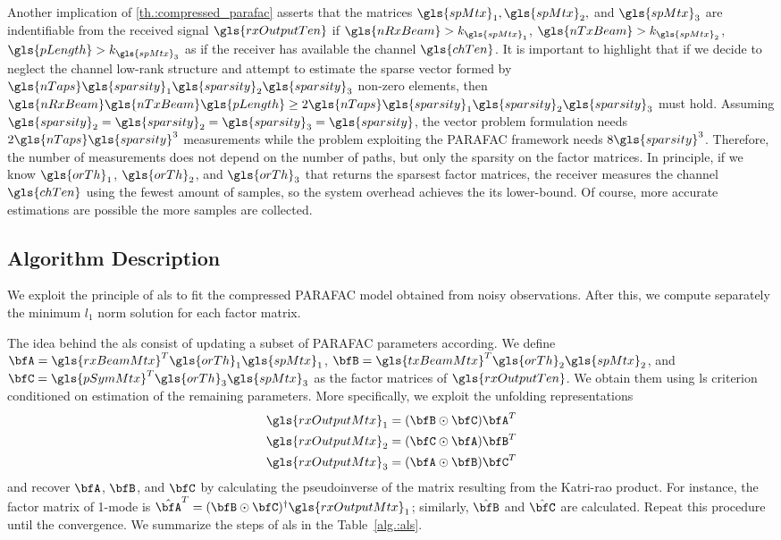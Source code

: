 \documentclass[conference]{IEEEtran}
\begin{document}
Another implication of \ref{th.:compressed_parafac} asserts that the matrices
$\gls{spMtx}_1, \gls{spMtx}_2,$ and $\gls{spMtx}_3$ are indentifiable from the
received signal $\gls{rxOutputTen}$ if $\gls{nRxBeam}>k_{\gls{spMtx}_1}$,
$\gls{nTxBeam}>k_{\gls{spMtx}_2}$, $\gls{pLength}>k_{\gls{spMtx}_3}$ as if the
receiver has available the channel $\gls{chTen}$. It is important to highlight
that if we decide to neglect the channel low-rank structure and attempt to
estimate the sparse vector formed by $\gls{nTaps} \gls{sparsity}_1
\gls{sparsity}_2 \gls{sparsity}_3$ non-zero elements, then
$\gls{nRxBeam}\gls{nTxBeam}\gls{pLength} \geq 2 \gls{nTaps}\gls{sparsity}_1\gls{sparsity}_2\gls{sparsity}_3$
must hold. Assuming
$\gls{sparsity}_2=\gls{sparsity}_2=\gls{sparsity}_3=\gls{sparsity}$, the vector
problem formulation needs $2\gls{nTaps}\gls{sparsity}^3$ measurements while the
problem exploiting the \gls{PARAFAC} framework needs $8\gls{sparsity}^3$.
Therefore, the number of measurements does not depend on the number of paths,
but only the sparsity on the factor matrices. In principle, if we know
$\gls{orTh}_1$, $\gls{orTh}_2$, and $\gls{orTh}_3$ that returns the sparsest
factor matrices, the receiver  measures the channel  $\gls{chTen}$ using the fewest
amount of samples, so the system overhead achieves the its lower-bound. Of
course, more accurate estimations are possible the more samples are collected.




\subsection{Algorithm Description}

We exploit the principle of \gls{als} to fit the compressed \gls{PARAFAC} model
obtained from noisy observations. After this, we compute separately the minimum $l_1$ norm
solution for each factor matrix.

The idea behind the \gls{als} consist of updating a subset of \gls{PARAFAC} parameters
according. We define $\bfA =
\gls{rxBeamMtx}^T\gls{orTh}_1\gls{spMtx}_1$, $\bfB =
\gls{txBeamMtx}^T\gls{orTh}_2\gls{spMtx}_2$, and $\bfC =
\gls{pSymMtx}^T\gls{orTh}_3\gls{spMtx}_3$   as the factor matrices of
$\gls{rxOutputTen}$. We obtain them using \gls{ls} criterion conditioned on estimation of the remaining
parameters. More specifically, we exploit the unfolding representations
\begin{align}
 \gls{rxOutputMtx}_1 = (\bfB \odot \bfC)\bfA^T \\
 \gls{rxOutputMtx}_2 = (\bfC \odot \bfA)\bfB^T \\
 \gls{rxOutputMtx}_3 = (\bfA \odot \bfB)\bfC^T
\end{align}
and recover $\bfA$, $\bfB$, and $\bfC$ by calculating the pseudoinverse of the
matrix resulting from the Katri-rao product. For instance, the factor matrix of
1-mode is $\hat{\bfA}^T = (\bfB \odot \bfC)^{\dagger}\gls{rxOutputMtx}_1 $;
similarly, $\hat{\bfB}$ and $\hat{\bfC}$ are calculated. Repeat this procedure
until the convergence. We summarize the steps of \gls{als} in the Table~\ref{alg.:als}. 
\end{document}
